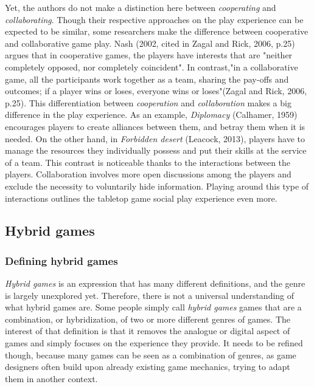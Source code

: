 Yet, the authors do not make a distinction here between \textit{cooperating} and \textit{collaborating}. Though their respective approaches on the play experience can be expected to be similar, some researchers make the difference between cooperative and collaborative game play. Nash (2002, cited in Zagal and Rick, 2006, p.25)\cite{art:collab} argues that in cooperative games, the players have interests that are "neither completely opposed, nor completely coincident". In contrast,"in a collaborative game, all the participants work together as a team, sharing the pay-offs and outcomes; if a player wins or loses, everyone wins or loses"(Zagal and Rick, 2006, p.25)\cite{art:collab}. This differentiation between \textit{cooperation} and \textit{collaboration} makes a big difference in the play experience. As an example, \textit{Diplomacy} (Calhamer, 1959)\cite{game:diplo} encourages players to create alliances between them, and betray them when it is needed. On the other hand, in \textit{Forbidden desert} (Leacock, 2013)\cite{game:desert}, players have to manage the resources they individually possess and put their skills at the service of a team. 
This contrast is noticeable thanks to the interactions between the players. Collaboration involves more open discussions among the players and exclude the necessity to voluntarily hide information. Playing around this type of interactions outlines the tabletop game social play experience even more. 

\subsection{Hybrid games}
\subsubsection{Defining hybrid games}
\textit{Hybrid games} is an expression that has many different definitions, and the genre is largely unexplored yet. Therefore, there is not a universal understanding of what hybrid games are. Some people simply call \textit{hybrid games} games that are a combination, or hybridization, of two or more different genres of games. The interest of that definition is that it removes the analogue or digital aspect of games and simply focuses on the experience they provide. It needs to be refined though, because many games can be seen as a combination of genres, as game designers often build upon already existing game mechanics, trying to adapt them in another context. 

